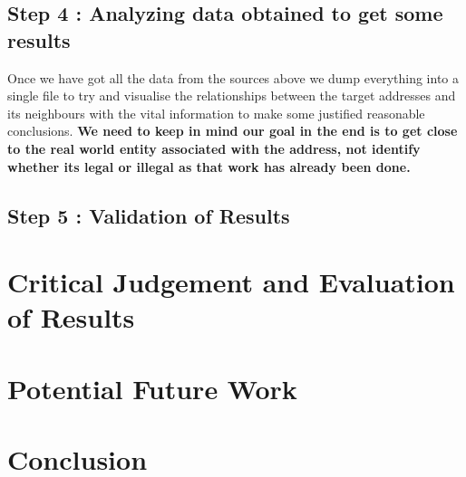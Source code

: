\documentclass{article}
\begin{document}
\pagebreak

    \subsection{Step 4 : Analyzing data obtained to get some results}
    
        Once we have got all the data from the sources above we dump everything into a single file to try and visualise the relationships between the target addresses and its neighbours with the vital information to make some justified reasonable conclusions. \textbf{We need to keep in mind our goal in the end is to get close to the real world entity associated with the address, not identify whether its legal or illegal as that work has already been done.} 
        
\pagebreak

    \subsection{Step 5 : Validation of Results}
        
        
\pagebreak
\section{Critical Judgement and Evaluation of Results}

\pagebreak
\section{Potential Future Work}

\pagebreak
\section{Conclusion}

\pagebreak

 
\end{document}
